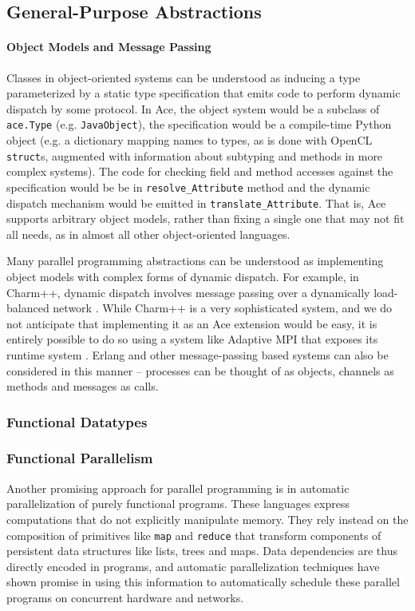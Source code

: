 \documentclass[9pt,preprint]{sigplanconf}
\begin{document}
\subsection{General-Purpose Abstractions}
\paragraph{Object Models and Message Passing}
Classes in object-oriented systems can be understood as inducing a type parameterized by a static type specification that emits code to perform dynamic dispatch by some protocol. In Ace, the object system would be a subclass of \verb|ace.Type| (e.g. \verb|JavaObject|), the specification would be a compile-time Python object (e.g. a dictionary mapping names to types, as is done with OpenCL \verb|struct|s, augmented with information about subtyping and methods in more complex systems). The code for checking field and method accesses against the specification would be be in \verb|resolve_Attribute| method and the dynamic dispatch mechanism would be emitted in \verb|translate_Attribute|. That is, Ace supports arbitrary object models, rather than fixing a single one that may not fit all needs, as in almost all other object-oriented languages.

Many parallel programming abstractions can be understood as implementing object models with complex forms of dynamic dispatch. For example, in Charm++, dynamic dispatch involves message passing over a dynamically load-balanced network \cite{kale1993charm++}. While Charm++ is a very sophisticated system, and we do not anticipate that implementing it as an Ace extension would be easy, it is entirely possible to do so using a system like Adaptive MPI that exposes its runtime system \cite{kale2009charm++}. Erlang and other message-passing based systems can also be considered in this manner -- processes can be thought of as objects, channels as methods and messages as calls.

\subsubsection{Functional Datatypes}

\subsubsection{Functional Parallelism}
Another promising approach for parallel programming is in automatic parallelization of purely functional programs. These languages express computations that do not explicitly manipulate memory. They rely instead on the composition of primitives like \verb|map| and \verb|reduce| that transform components of persistent data structures like lists, trees and maps. Data dependencies are thus directly encoded in programs, and automatic parallelization techniques have shown promise in using this information to automatically schedule these parallel programs on concurrent hardware and networks.
\end{document}
